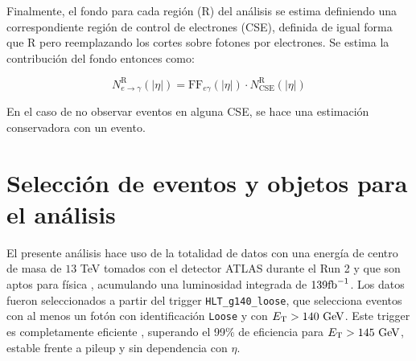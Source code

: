 \begin{table}
\centering
\caption{Factores de reconstrucción errónea de electrones como fotones en función de $|\eta|$ para todos los datos del Run 2. Se ponen explícitas las incertidumbres estadísticas y sistemáticas provenientes de variar la ventana de integración, no emplear la sustracción de fondo y el sesgo en la energía de los fotones.}
\label{tab:efakes_ff}
\end{table}


Finalmente, el fondo para cada región (R) del análisis se estima definiendo una correspondiente región de control de electrones (CSE), definida de igual forma que R pero reemplazando los cortes sobre fotones por electrones. Se estima la contribución del fondo entonces como:

\begin{equation}
  N^{\text{R}}_{e\rightarrow\gamma}(|\eta|) = \text{FF}_{e\gamma}(|\eta|)\cdot N^{\text{R}}_{\mathrm{CSE}}(|\eta|)
\end{equation}

En el caso de no observar eventos en alguna CSE, se hace una estimación conservadora con un evento.



\section{Selección de eventos y objetos para el análisis}\label{sec:selection}

El presente análisis hace uso de la totalidad de datos con una energía de centro de masa de $13$ TeV tomados con el detector ATLAS durante el Run 2 y que son aptos para física , acumulando una luminosidad integrada de $139 \text{fb}^{-1}$. Los datos fueron seleccionados a partir del trigger \texttt{HLT\_g140\_loose}, que selecciona eventos con al menos un fotón con identificación \texttt{Loose} y con $E_{\text{T}}>140\ \text{GeV}$. Este trigger es completamente eficiente \cite{TRIG-2018-05}, superando el 99\% de eficiencia para $E_{\text{T}}>145\ \text{GeV}$, estable frente a pileup y sin dependencia con $\eta$.

